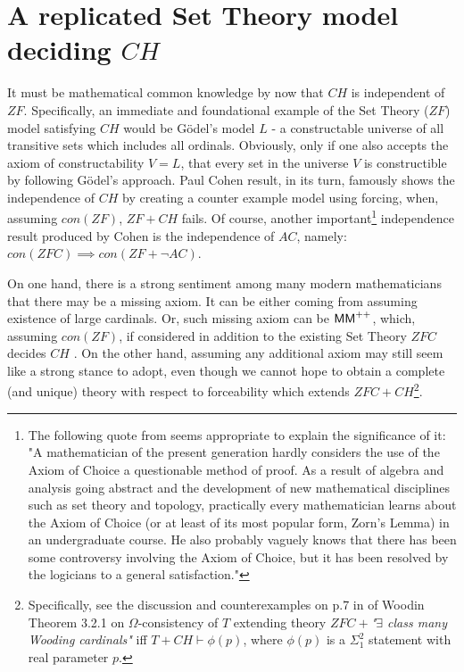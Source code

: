 \pagebreak
\section{A replicated Set Theory model deciding $CH$}\label{sec_rep_model}


It must be mathematical common knowledge by now that $CH$ is independent of $ZF$. Specifically, an immediate and foundational example of the Set Theory ($ZF$) model satisfying $CH$ would be Gödel's model $L$ \cite{jech2003set} - a constructable universe of all transitive sets which includes all ordinals. Obviously, only if one also accepts the axiom of constructability $V=L$, that every set in the universe $V$ is constructible by following Gödel's approach. Paul Cohen result, in its turn, famously shows the independence of $CH$ by creating a counter example model using forcing, when, assuming $con(ZF)$, $ZF+CH$ fails. Of course, another important\footnote{The following quote from \cite{Jech1973AboutTA} seems appropriate to explain the significance of it: "A mathematician of the present generation hardly considers the use of the Axiom of Choice a questionable method of proof. As a result of algebra and analysis going abstract and the development of new mathematical disciplines such as set theory and topology, practically every mathematician learns about the Axiom of Choice (or at least of its most popular form, Zorn’s Lemma) in an undergraduate course. He also probably vaguely knows that there has been some controversy involving the Axiom of Choice, but it has been resolved by the logicians to a general satisfaction."} independence result produced by Cohen is the independence of $AC$, namely: $con(ZFC) \implies con(ZF + \neg AC)$.

On one hand, there is a strong sentiment among many modern mathematicians that there may be a missing axiom. It can be either coming from assuming existence of large cardinals. Or, such missing axiom can be ${\sf MM}^{++}$, which, assuming $con(ZF)$, if considered in addition to the existing Set Theory $ZFC$ decides $CH$ \cite{aspero2021sf}. On the other hand, assuming any additional axiom may still seem like a strong stance to adopt, even though we cannot hope to obtain a complete (and unique) theory with respect to forceability which extends $ZFC + CH$\footnote{Specifically, see the discussion and counterexamples on p.7 in \cite{viale2016category} of Woodin Theorem 3.2.1 \cite{Larson2010} on $\Omega$-consistency of $T$ extending theory $ZFC+$\textit{"$\exists$ class many Wooding cardinals"} iff $T+CH \vdash \phi(p) $, where $\phi(p)$ is a $\Sigma^2_1$ statement with real parameter $p$.}.

